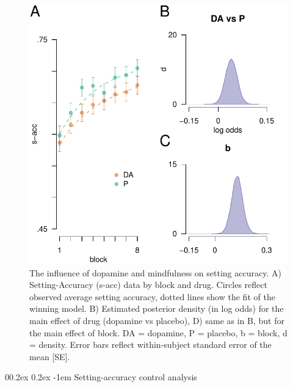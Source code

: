 \documentclass[
  man]{apa6}
\makeatletter
\let\oldparagraph\paragraph
\renewcommand{\paragraph}[1]{\oldparagraph{#1}\mbox{}}
\renewcommand{\paragraph}{\@startsection{paragraph}{4}{\parindent}%
  {0\baselineskip \@plus 0.2ex \@minus 0.2ex}%
  {-1em}%
  {\normalfont\normalsize\bfseries\itshape\typesectitle}}
\makeatother
\begin{document}
\begin{figure}

{\centering \includegraphics[width=0.7\linewidth]{../../images/cacc_fig} 

}

\caption{The influence of dopamine and mindfulness on setting accuracy. A) Setting-Accuracy (s-acc) data by block and drug. Circles reflect observed average setting accuracy, dotted lines show the fit of the winning model. B) Estimated posterior density (in log odds) for the main effect of drug (dopamine vs placebo), D) same as in B, but for the main effect of block. DA = dopamine, P = placebo, b = block, d = density. Error bars reflect within-subject standard error of the mean [SE].}\label{fig:caccfig}
\end{figure}

\hypertarget{setting-accuracy-control-analysis}{%
\paragraph{Setting-accuracy control analysis}\label{setting-accuracy-control-analysis}}
\end{document}
